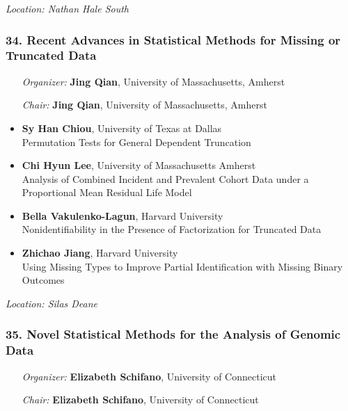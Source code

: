 \emph{Location: Nathan Hale South}

\subsubsection*{34. Recent Advances in Statistical Methods for Missing or Truncated Data}

\begin{enumerate}[align=left]
\item [\emph{Organizer:}] \textbf{Jing Qian}, University of Massachusetts, Amherst
\item [\emph{Chair:}] \textbf{Jing Qian}, University of Massachusetts, Amherst
\end{enumerate}

\begin{itemize}
\item \textbf{Sy Han Chiou}, University of Texas at Dallas \\
Permutation Tests for General Dependent Truncation
\item \textbf{Chi Hyun Lee}, University of Massachusetts Amherst \\
Analysis of Combined Incident and Prevalent Cohort Data under a Proportional Mean Residual Life Model
\item \textbf{Bella Vakulenko-Lagun}, Harvard University \\
Nonidentifiability in the Presence of Factorization for Truncated Data
\item \textbf{Zhichao Jiang}, Harvard University \\
Using Missing Types to Improve Partial Identification with Missing Binary Outcomes
\end{itemize}

\emph{Location: Silas Deane}

\subsubsection*{35. Novel Statistical Methods for the Analysis of Genomic Data}

\begin{enumerate}[align=left]
\item [\emph{Organizer:}] \textbf{Elizabeth Schifano}, University of Connecticut
\item [\emph{Chair:}] \textbf{Elizabeth Schifano}, University of Connecticut
\end{enumerate}

